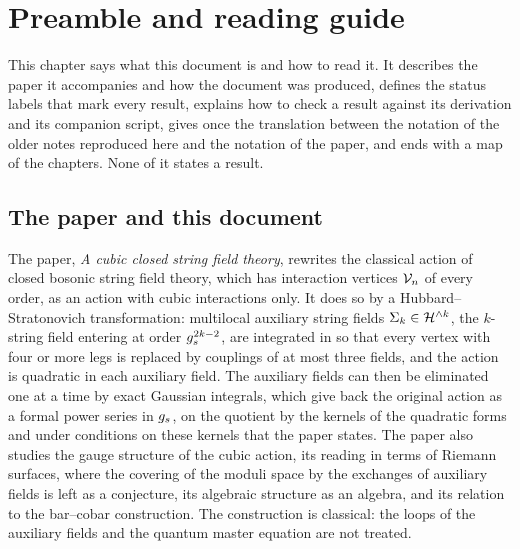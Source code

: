 \section{Preamble and reading guide}
\label{ch:preamble}

This chapter says what this document is and how to read it.
It describes the paper it accompanies and how the document was produced, defines the status labels that mark every result, explains how to check a result against its derivation and its companion script, gives once the translation between the notation of the older notes reproduced here and the notation of the paper, and ends with a map of the chapters.
None of it states a result.

\subsection{The paper and this document}
\label{sec:pre:document}

The paper, \emph{A cubic closed string field theory}, rewrites the classical action of closed bosonic string field theory, which has interaction vertices $\mathcal{V}_{n}$ of every order, as an action with cubic interactions only.
It does so by a Hubbard--Stratonovich transformation: multilocal auxiliary string fields $\Sigma_k \in \mathcal{H}^{\wedge k}$, the $k$-string field entering at order $g_s^{2 k - 2}$, are integrated in so that every vertex with four or more legs is replaced by couplings of at most three fields, and the action is quadratic in each auxiliary field.
The auxiliary fields can then be eliminated one at a time by exact Gaussian integrals, which give back the original action as a formal power series in $g_s$, on the quotient by the kernels of the quadratic forms and under conditions on these kernels that the paper states.
The paper also studies the gauge structure of the cubic action, its reading in terms of Riemann surfaces, where the covering of the moduli space by the exchanges of auxiliary fields is left as a conjecture, its algebraic structure as an \IBL{} algebra, and its relation to the bar--cobar construction.
The construction is classical: the loops of the auxiliary fields and the quantum master equation are not treated.

